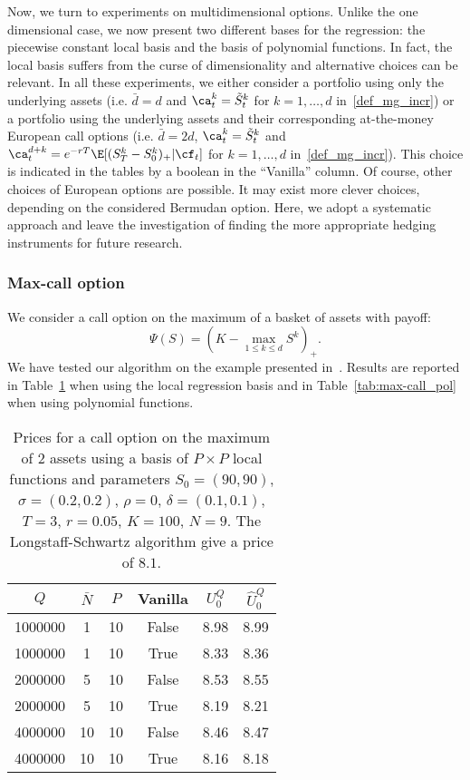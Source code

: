 Now, we turn to experiments on multidimensional options. Unlike the one dimensional case, we now present two different bases for the regression: the piecewise constant local basis and the basis of polynomial functions. In fact, the local basis suffers from the curse of dimensionality and alternative choices can be relevant. In all these experiments, we either consider a portfolio using only the underlying assets (i.e. $\bar{d}=d$ and $\ca^k_t=\tilde{S}^k_t$ for $k=1,\dots,d$ in~\eqref{def_mg_incr}) or a portfolio using  the underlying assets and their corresponding at-the-money  
European call options (i.e. $\bar{d}=2d$, $\ca^k_t=\tilde{S}^k_t$ and $\ca^{d+k}_t=e^{-rT }\E[(S^k_T-S^k_0)_+ |\cf_t]$ for $k=1,\dots,d$ in~\eqref{def_mg_incr}). This choice is indicated in the tables  by a boolean in the ``Vanilla'' column. Of course, other choices of European options are possible. It may exist more clever choices, depending on the  considered Bermudan option. Here, we adopt a systematic approach and leave the investigation of finding the more appropriate hedging instruments for future research. 


\subsubsection{Max-call option}

We consider a call option on the maximum of a basket of assets with payoff:
\[ \Psi(S)= \left(K - \max_{1 \le k \le d} S^k\right)_+.\]
We have tested our algorithm on the example presented in~\cite[Table 2]{AB}. Results are reported in Table~\ref{tab:max-call_loc} when using the local regression basis and in Table~\ref{tab:max-call_pol} when using polynomial functions.

\begin{table}[h!]
  \centering\begin{tabular}{cccccc}
    \hline
    $Q$ & $\bar{N}$ & $P$ & Vanilla\phantom{$\Big|$} & $U_0^Q$ & $\hat{U}_0^Q$ \\
    \hline
    1000000 & 1 & 10 & False & 8.98 & 8.99 \\
    1000000 & 1 & 10 & True & 8.33 & 8.36 \\
    2000000 & 5 & 10 & False & 8.53 & 8.55 \\
    2000000 & 5 & 10 & True & 8.19 & 8.21 \\
    4000000 & 10 & 10 & False & 8.46 & 8.47 \\
    4000000 & 10 & 10 & True & 8.16 & 8.18 \\
    \hline
    \end{tabular}
    \caption{Prices for a call option on the maximum of 2 assets using a basis of $P\times P$ local functions  and parameters $S_0=(90, 90)$, $\sigma=(0.2,0.2)$, $\rho=0$, $\delta=(0.1,0.1)$, $T=3$, $r=0.05$, $K=100$, $N=9$. The Longstaff-Schwartz algorithm give a price of $8.1$.}\label{tab:max-call_loc}
\end{table}

